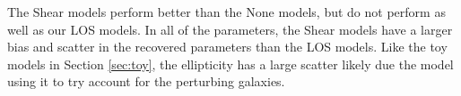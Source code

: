 The Shear models perform better than the None models, but do not perform as well as our LOS models. In all of the parameters, the Shear models have a larger bias and scatter in the recovered parameters than the LOS models. Like the toy models in Section \ref{sec:toy}, the ellipticity has a large scatter likely due the model using it to try account for the perturbing galaxies.
  